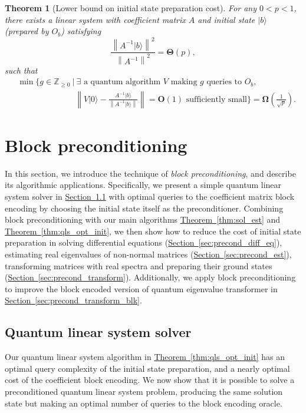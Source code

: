 \documentclass[letterpaper,onecolumn,11pt,accepted=2026-02-14]{quantumarticle}
\newcommand{\norm}[1]{\left\lVert#1\right\rVert}
\newtheorem{theorem}{Theorem}
\theoremstyle{remark}
\theoremstyle{plain}
\newcommand{\thm}[1]{\hyperref[thm:#1]{Theorem~\ref*{thm:#1}}}
\renewcommand{\sec}[1]{\hyperref[sec:#1]{Section~\ref*{sec:#1}}}
\newcommand{\ket}[1]{|#1\rangle}
\begin{document}
\begin{theorem}[Lower bound on initial state preparation cost]
\label{thm:qls_lower}
For any $0<p<1$, there exists a linear system with coefficient matrix $A$ and initial state $\ket{b}$ (prepared by $O_b$) satisfying
\begin{equation}
    \frac{\norm{A^{-1}\ket{b}}^2}{\norm{A^{-1}}^2}=\mathbf{\Theta}(p),
\end{equation}
such that
\begin{equation}
\begin{aligned}
    &\min\bigg\{g\in\mathbb Z_{\geq0}\ \Big|\
    \exists\text{ a quantum algorithm }V\text{ making }g\text{ queries to }O_b,\\
    &\qquad\qquad\qquad\quad\norm{V\ket{0}-\frac{A^{-1}\ket{b}}{\norm{A^{-1}\ket{b}}}}=\mathbf{O}(1)\text{ sufficiently small}\bigg\}
    =\mathbf{\Omega}\left(\frac{1}{\sqrt{p}}\right).
\end{aligned}
\end{equation}
\end{theorem}

\section{Block preconditioning}
\label{sec:precond}

In this section, we introduce the technique of \emph{block preconditioning}, and describe its algorithmic applications. Specifically, we present a simple quantum linear system solver in \sec{precond_qls} with optimal queries to the coefficient matrix block encoding by choosing the initial state itself as the preconditioner. Combining block preconditioning with our main algorithms \thm{sol_est} and \thm{qls_opt_init}, we then show how to reduce the cost of initial state preparation in solving differential equations (\sec{precond_diff_eq}), estimating real eigenvalues of non-normal matrices (\sec{precond_est}), transforming matrices with real spectra and preparing their ground states (\sec{precond_transform}). Additionally, we apply block preconditioning to improve the block encoded version of quantum eigenvalue transformer in \sec{precond_transform_blk}.

\subsection{Quantum linear system solver}
\label{sec:precond_qls}
Our quantum linear system algorithm in \thm{qls_opt_init} has an optimal query complexity of the initial state preparation, and a nearly optimal cost of the coefficient block encoding. We now show that it is possible to solve a preconditioned quantum linear system problem, producing the same solution state but making an optimal number of queries to the block encoding oracle.
\end{document}
